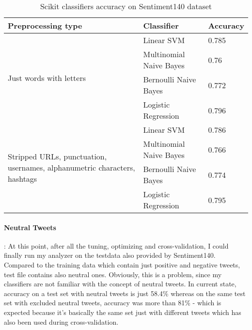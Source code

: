 \begin{table}[H]
\centering
\begin{tabular}{|p{5cm}|p{5cm}|p{3cm}|}
 \hline
\textbf{Preprocessing type} & \textbf{ Classifier }& \textbf{Accuracy}\\
 \hline
 \multirow{4}{*}{\parbox{5cm}{\centering Just words with letters}} & Linear SVM   & 0.785\\ 
   &  Multinomial Naive Bayes & 0.76\\ 
   &  Bernoulli Naive Bayes & 0.772\\  
   & Logistic Regression & 0.796\\ \hline 
  \multirow{4}{*}{\parbox{5cm}{\centering Stripped URLs, punctuation, usernames, alphanumetric characters, hashtags}} & Linear SVM   & 0.786\\ 
   &  Multinomial Naive Bayes & 0.766\\ 
   &  Bernoulli Naive Bayes & 0.774\\  
   & Logistic Regression & 0.795\\ \hline 
\end{tabular}
\caption{Scikit classifiers accuracy on Sentiment140 dataset}
\label{table:preprocesingAccuracy}
\end{table}


\paragraph{Neutral Tweets}: At this point, after all the tuning, optimizing and cross-validation, I could finally run my analyzer on the testdata also provided by Sentiment140. Compared to the training data which contain just positive and negative tweets, test file contains also neutral ones. Obviously, this is a problem, since my classifiers are not familiar with the concept of neutral tweets. In current state, accuracy on a test set with neutral tweets is just 58.4\% whereas on the same test set with excluded neutral tweets, accuracy was more than 81\% - which is expected because it's basically the same set just with different tweets which has also been used	 during cross-validation. 

